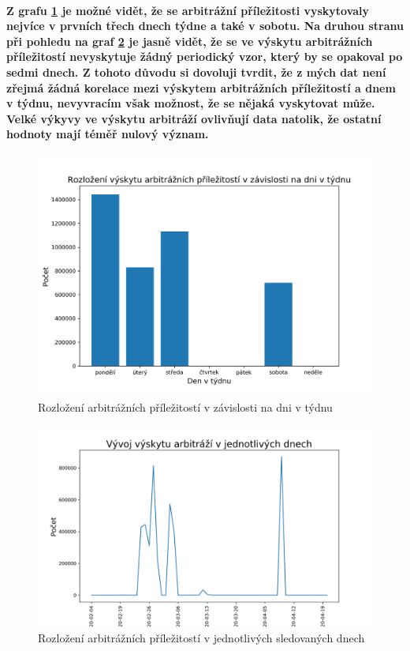 \documentclass[thesis=B,czech]{FITthesis}[2019/03/21]
\begin{document}
\paragraph{
Z grafu \ref{weekday_distribution} je možné vidět, že se arbitrážní příležitosti vyskytovaly nejvíce v prvních třech dnech týdne a také v sobotu. Na druhou stranu při pohledu na graf \ref{occurences} je jasně vidět, že se ve výskytu arbitrážních příležitostí nevyskytuje žádný periodický vzor, který by se opakoval po sedmi dnech. Z tohoto důvodu si dovoluji tvrdit, že z mých dat není zřejmá žádná korelace mezi výskytem arbitrážních příležitostí a dnem v týdnu, nevyvracím však možnost, že se nějaká vyskytovat může. Velké výkyvy ve výskytu arbitráží ovlivňují data natolik, že ostatní hodnoty mají téměř nulový význam.
}
\begin{figure}\centering
	\includegraphics[width=1\textwidth]{images/weekday_distribution.png}
	\caption{Rozložení arbitrážních příležitostí v závislosti na dni v týdnu }\label{weekday_distribution}
\end{figure}
\begin{figure}\centering
	\includegraphics[width=1\textwidth]{images/occurences.png}
	\caption{Rozložení arbitrážních příležitostí v jednotlivých sledovaných dnech}\label{occurences}
\end{figure}
\end{document}
